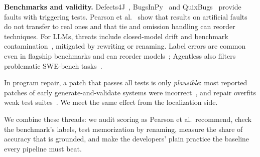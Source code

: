 \textbf{Benchmarks and validity.} Defects4J~\cite{just2014}, BugsInPy~\cite{widyasari2020} and QuixBugs~\cite{lin2017quixbugs}
provide faults with triggering tests. Pearson et al.~\cite{pearson2017} show that results on artificial faults do not
transfer to real ones and that tie and omission handling can reorder techniques. For LLMs, threats include closed-model
drift and benchmark contamination~\cite{sallou2024,ramos2024memorize,xu2024contam}, mitigated by rewriting or renaming.
Label errors are common even in flagship benchmarks and can reorder models~\cite{northcutt2021labels}; Agentless also
filters problematic SWE-bench tasks~\cite{xia2024agentless}.

In program repair, a patch that passes all tests is only \emph{plausible}: most reported
patches of early generate-and-validate systems were incorrect~\cite{qi2015kali}, and repair overfits weak test
suites~\cite{smith2015cure}. We meet the same effect from the localization side.

We combine these threads: we audit scoring as Pearson et al.\ recommend, check the benchmark's labels,
test memorization by renaming, measure the share of accuracy that is grounded, and make the developers' plain practice
the baseline every pipeline must beat.

